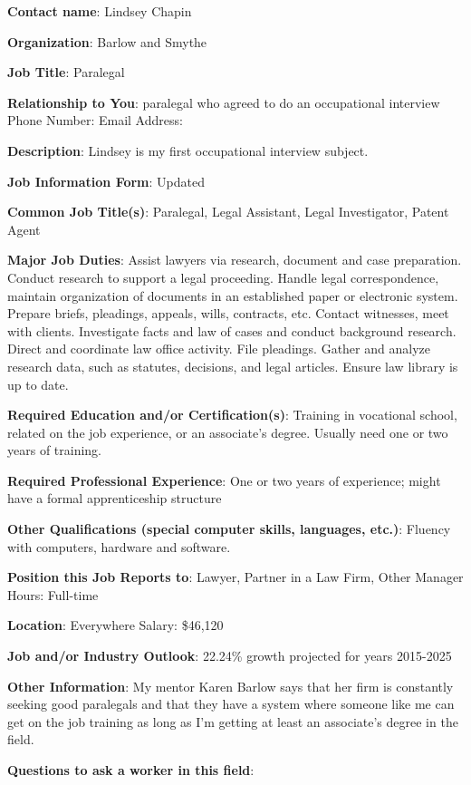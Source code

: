 \textbf{Contact name}: Lindsey Chapin 

\textbf{Organization}: Barlow and Smythe 

\textbf{Job Title}: Paralegal

\textbf{Relationship to You}: paralegal who agreed to do an occupational interview Phone Number: Email Address:

\textbf{Description}: Lindsey is my first occupational interview subject. 

\textbf{Job Information Form}: Updated

\textbf{Common Job Title(s)}: Paralegal, Legal Assistant, Legal Investigator, Patent Agent

\textbf{Major Job Duties}: Assist lawyers via research, document and case preparation. Conduct research to support a legal proceeding. Handle legal correspondence, maintain organization of documents in an established paper or electronic system. Prepare briefs, pleadings, appeals, wills, contracts, etc. Contact witnesses, meet with clients. Investigate facts and law of cases and conduct background research. Direct and coordinate law office activity. File pleadings. Gather and analyze research data, such as statutes, decisions, and legal articles. Ensure law library is up to date.

\textbf{Required Education and/or Certification(s)}: Training in vocational school, related on the job experience, or an associate's degree. Usually need one or two years of training.

\textbf{Required Professional Experience}: One or two years of experience; might have a formal apprenticeship structure

\textbf{Other Qualifications (special computer skills, languages, etc.)}: Fluency with computers, hardware and software.

\textbf{Position this Job Reports to}: Lawyer, Partner in a Law Firm, Other Manager Hours: Full-time

\textbf{Location}: Everywhere Salary: \$46,120

\textbf{Job and/or Industry Outlook}: 22.24\% growth projected for years 2015-2025

\textbf{Other Information}: My mentor Karen Barlow says that her firm is constantly seeking good paralegals and that they have a system where someone like me can get on the job training as long as I'm getting at least an associate's degree in the field.

\textbf{Questions to ask a worker in this field}:

